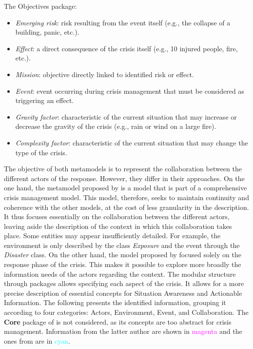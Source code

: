 The Objectives package:
\begin{itemize}
    \item \textit{Emerging risk}: risk resulting from the event itself (e.g., the collapse of a building, panic, etc.).
    \item \textit{Effect}: a direct consequence of the crisis itself (e.g., 10 injured people, fire, etc.).
    \item \textit{Mission}: objective directly linked to identified risk or effect.
    \item \textit{Event}: event occurring during crisis management that must be considered as triggering an effect.
    \item \textit{Gravity factor}: characteristic of the current situation that may increase or decrease the gravity of the crisis (e.g., rain or wind on a large fire).
    \item \textit{Complexity factor}: characteristic of the current situation that may change the type of the crisis.
\end{itemize}

The objective of both metamodels is to represent the collaboration between the different actors of the response.
However, they differ in their approaches.
On the one hand, the metamodel proposed by \textcite{othmanDevelopmentValidationDisaster2014} is a model that is part of a comprehensive crisis management model.
This model, therefore, seeks to maintain continuity and coherence with the other models, at the cost of less granularity in the description.
It thus focuses essentially on the collaboration between the different actors, leaving aside the description of the context in which this collaboration takes place.
Some entities may appear insufficiently detailed.
For example, the environment is only described by the class \textit{Exposure} and the event through the \textit{Disaster} class.
On the other hand, the model proposed by \textcite{benabenMetamodelKnowledgeManagement2016} focused solely on the response phase of the crisis.
This makes it possible to explore more broadly the information needs of the actors regarding the context.
The modular structure through packages allows specifying each aspect of the crisis.
It allows for a more precise description of essential concepts for Situation Awareness and Actionable Information.
The following presents the identified information, grouping it according to four categories: Actors, Environment, Event, and Collaboration.
The \textbf{Core} package of \textcite{benabenMetamodelKnowledgeManagement2016} is not considered, as its concepts are too abstract for crisis management.
Information from the latter author are shown in \textcolor{magenta}{magenta} and the ones from \textcite{benabenMetamodelKnowledgeManagement2016} are in \textcolor{cyan}{cyan}.

